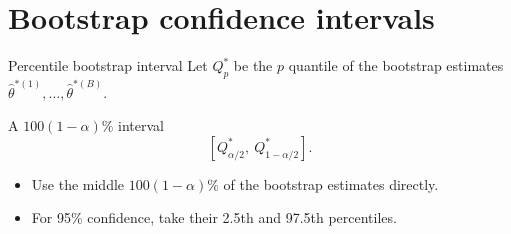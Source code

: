 \documentclass[aspectratio=169,11pt]{beamer}
\begin{document}
\section{Bootstrap confidence intervals}

\begin{frame}{Percentile bootstrap interval}
  Let \(Q_p^*\) be the \(p\) quantile of the bootstrap estimates
  \(\widehat\theta^{*(1)},\ldots,\widehat\theta^{*(B)}\).
  \begin{block}{A \(100(1-\alpha)\%\) interval}
    \[
      \left[Q_{\alpha/2}^*,\ Q_{1-\alpha/2}^*\right].
    \]
  \end{block}
  \begin{itemize}
    \item Use the middle \(100(1-\alpha)\%\) of the bootstrap estimates directly.
    \item For 95\% confidence, take their 2.5th and 97.5th percentiles.
  \end{itemize}
\end{frame}


\end{document}
